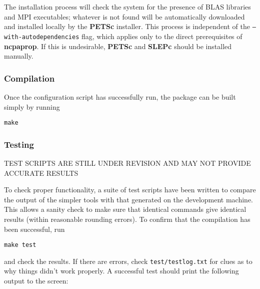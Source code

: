 \noindent The installation process will check the system for the presence of BLAS libraries and MPI executables; whatever is not found will be automatically downloaded and installed locally by the \textbf{PETSc} installer.  This process is independent of the \texttt{--with-autodependencies} flag, which applies only to the direct prerequisites of \textbf{ncpaprop}.  If this is undesirable, \textbf{PETSc} and \textbf{SLEPc} should be installed manually.

\subsubsection{Compilation}

Once the configuration script has successfully run, the package can be built simply by running

\texttt{make}

\subsubsection{Testing}

\noindent TEST SCRIPTS ARE STILL UNDER REVISION AND MAY NOT PROVIDE ACCURATE RESULTS

To check proper functionality, a suite of test scripts have been written to compare the output of the simpler tools with that generated on the development machine.  This allows a sanity check to make sure that identical commands give identical results (within reasonable rounding errors).  To confirm that the compilation has been successful, run

\texttt{make test}

\noindent
and check the results.  If there are errors, check \texttt{test/testlog.txt} for clues as to why things didn't work properly.  A successful test should print the following output to the screen:

